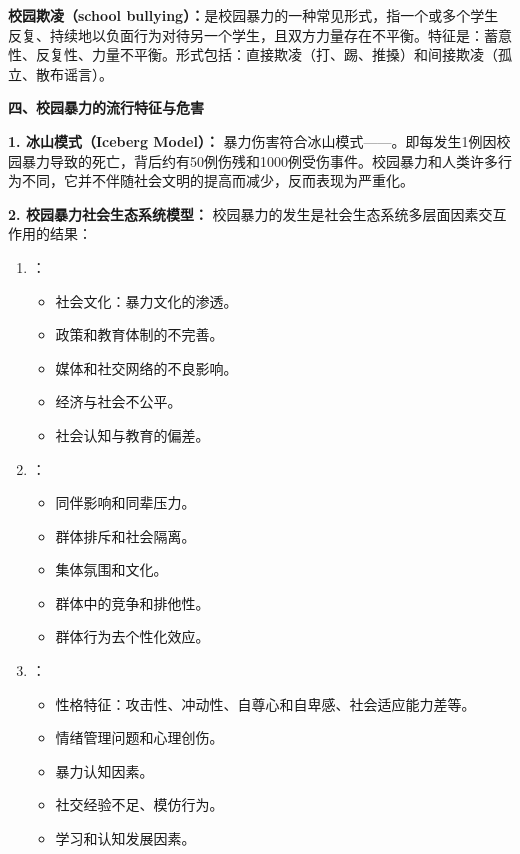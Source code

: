 \begin{defbox}
\textbf{校园欺凌（school bullying）：}是校园暴力的一种常见形式，指一个或多个学生反复、持续地以负面行为对待另一个学生，且双方力量存在不平衡。特征是：蓄意性、反复性、力量不平衡。形式包括：直接欺凌（打、踢、推搡）和间接欺凌（孤立、散布谣言）。
\end{defbox}

\begin{keybox}
\textbf{四、校园暴力的流行特征与危害}

\textbf{1. 冰山模式（Iceberg Model）：}
暴力伤害符合冰山模式——。即每发生1例因校园暴力导致的死亡，背后约有50例伤残和1000例受伤事件。校园暴力和人类许多行为不同，它并不伴随社会文明的提高而减少，反而表现为严重化。

\textbf{2. 校园暴力社会生态系统模型：}
校园暴力的发生是社会生态系统多层面因素交互作用的结果：

\begin{enumerate}[leftmargin=*]
    \item {}：
    \begin{itemize}
        \item 社会文化：暴力文化的渗透。
        \item 政策和教育体制的不完善。
        \item 媒体和社交网络的不良影响。
        \item 经济与社会不公平。
        \item 社会认知与教育的偏差。
    \end{itemize}
    \item {}：
    \begin{itemize}
        \item 同伴影响和同辈压力。
        \item 群体排斥和社会隔离。
        \item 集体氛围和文化。
        \item 群体中的竞争和排他性。
        \item 群体行为去个性化效应。
    \end{itemize}
    \item {}：
    \begin{itemize}
        \item 性格特征：攻击性、冲动性、自尊心和自卑感、社会适应能力差等。
        \item 情绪管理问题和心理创伤。
        \item 暴力认知因素。
        \item 社交经验不足、模仿行为。
        \item 学习和认知发展因素。
    \end{itemize}
\end{enumerate}
\end{keybox}

